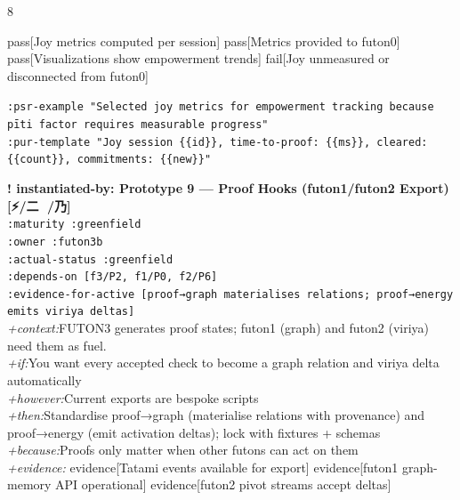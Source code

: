 \documentclass[landscape]{article}
\newcommand{\flexitag}[1]{\textcolor[gray]{0.35}{\textit{#1}}}
\newenvironment{devmapgreenfield}{%
  \def\FrameCommand{\colorbox{devmapgreenfieldbg}}%
  \setlength{\fboxsep}{2pt}%
  \MakeFramed{\advance\hsize-\width \FrameRestore}%
}{\endMakeFramed}
\begin{document}
\begin{paracol}{8}
\begin{devmapgreenfield}
    pass[Joy metrics computed per session] pass[Metrics provided to futon0] pass[Visualizations show empowerment trends] fail[Joy unmeasured or disconnected from futon0]\\
\par
  \texttt{:\allowbreak{}psr-\allowbreak{}example "Selected joy metrics for empowerment tracking because pīti factor requires measurable progress"}\\
  \texttt{:\allowbreak{}pur-\allowbreak{}template "Joy session \{\{id\}\},\allowbreak{} time-\allowbreak{}to-\allowbreak{}proof:\allowbreak{} \{\{ms\}\},\allowbreak{} cleared:\allowbreak{} \{\{count\}\},\allowbreak{} commitments:\allowbreak{} \{\{new\}\}"}\\
\par
\par
\end{devmapgreenfield}
\begin{devmapgreenfield}
\textbf{! instantiated-by: Prototype 9 — Proof Hooks (futon1/futon2 Export) [⚡️/二 🙅/乃]}\\
  \texttt{:\allowbreak{}maturity :\allowbreak{}greenfield}\\
  \texttt{:\allowbreak{}owner :\allowbreak{}futon3b}\\
  \texttt{:\allowbreak{}actual-\allowbreak{}status :\allowbreak{}greenfield}\\
  \texttt{:\allowbreak{}depends-\allowbreak{}on [f3/\allowbreak{}P2,\allowbreak{} f1/\allowbreak{}P0,\allowbreak{} f2/\allowbreak{}P6]}\\
  \texttt{:\allowbreak{}evidence-\allowbreak{}for-\allowbreak{}active [proof→graph materialises relations;\allowbreak{} proof→energy emits viriya deltas]}\\
  \flexitag{+context:}FUTON3 generates proof states; futon1 (graph) and futon2 (viriya) need them as fuel.\\
  \flexitag{+if:}You want every accepted check to become a graph relation and viriya delta automatically\\
  \flexitag{+however:}Current exports are bespoke scripts\\
  \flexitag{+then:}Standardise proof→graph (materialise relations with provenance) and proof→energy (emit activation deltas); lock with fixtures + schemas\\
  \flexitag{+because:}Proofs only matter when other futons can act on them\\
  \flexitag{+evidence:} evidence[Tatami events available for export] evidence[futon1 graph-memory API operational] evidence[futon2 pivot streams accept deltas]\\

\end{devmapgreenfield}
\end{paracol}
\end{document}
